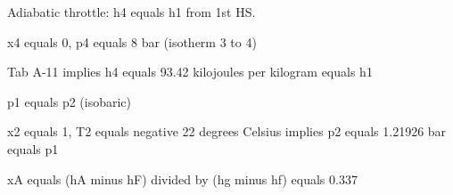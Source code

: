 Adiabatic throttle: h4 equals h1 from 1st HS.

x4 equals 0, p4 equals 8 bar (isotherm 3 to 4)

Tab A-11 implies h4 equals 93.42 kilojoules per kilogram equals h1

p1 equals p2 (isobaric)

x2 equals 1, T2 equals negative 22 degrees Celsius implies p2 equals 1.21926 bar equals p1

xA equals (hA minus hF) divided by (hg minus hf) equals 0.337